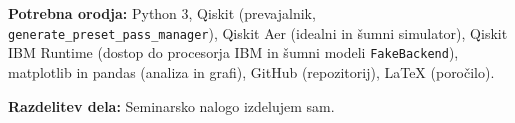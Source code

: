 \documentclass[11pt,a4paper]{article}
\begin{document}
\textbf{Potrebna orodja:} Python 3, Qiskit (prevajalnik,
\texttt{generate\_preset\_pass\_manager}), Qiskit Aer (idealni in šumni
simulator), Qiskit IBM Runtime (dostop do procesorja IBM
in šumni modeli \texttt{FakeBackend}), matplotlib in pandas
(analiza in grafi), GitHub (repozitorij), \LaTeX{} (poročilo).

\textbf{Razdelitev dela:} Seminarsko nalogo izdelujem sam.
\end{document}

